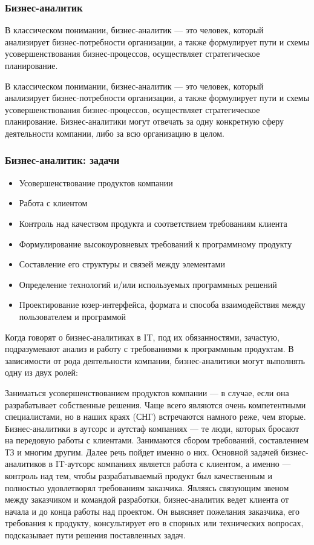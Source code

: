 \documentclass{../industrial-development}
\begin{document}
\begin{frame} \frametitle{Бизнес-аналитик}
	\begin{block}{}
		\alert {} В классическом понимании, {бизнес-аналитик} — это человек, который анализирует бизнес-потребности организации, а также формулирует пути и схемы усовершенствования бизнес-процессов, осуществляет стратегическое планирование. 
	\end{block}
\end{frame}

\lecturenotes

В классическом понимании, бизнес-аналитик — это человек, который анализирует бизнес-потребности организации, а также формулирует пути и схемы усовершенствования бизнес-процессов, осуществляет стратегическое планирование. Бизнес-аналитики могут отвечать за одну конкретную сферу деятельности компании, либо за всю организацию в целом.   ~\cite{Business}

\begin{frame} \frametitle{Бизнес-аналитик: задачи}
  \begin{itemize}
  \item Усовершенствование продуктов компании
  \item Работа с клиентом
  \item Контроль над качеством продукта и соответствием требованиям клиента
  \item Формулирование высокоуровневых требований к программному продукту
  \item Составление его структуры и связей между элементами
\item Определение технологий и/или используемых программных решений
\item Проектирование юзер-интерфейса, формата и способа взаимодействия между пользователем и программой
  \end{itemize}
\end{frame}

\lecturenotes
Когда говорят о бизнес-аналитиках в IT, под их обязанностями, зачастую, подразумевают анализ и работу с требованиями к программным продуктам. В зависимости от рода деятельности компании, бизнес-аналитики могут выполнять одну из двух ролей:

Заниматься усовершенствованием продуктов компании — в случае, если она разрабатывает собственные решения. Чаще всего являются очень компетентными специалистами, но в наших краях (СНГ) встречаются намного реже, чем вторые.
Бизнес-аналитики в аутсорс и аутстаф компаниях — те люди, которых бросают на передовую работы с клиентами. Занимаются сбором требований, составлением ТЗ и многим другим. Далее речь пойдет именно о них.
Основной задачей бизнес-аналитиков в IT-аутсорс компаниях является работа с клиентом, а именно — контроль над тем, чтобы разрабатываемый продукт был качественным и полностью удовлетворял требованиям заказчика.
Являясь связующим звеном между заказчиком и командой разработки, бизнес-аналитик ведет клиента от начала и до конца работы над проектом. Он выясняет пожелания заказчика, его требования к продукту, консультирует его в спорных или технических вопросах, подсказывает пути решения поставленных задач.~\cite{Business}
 
\end{document}
